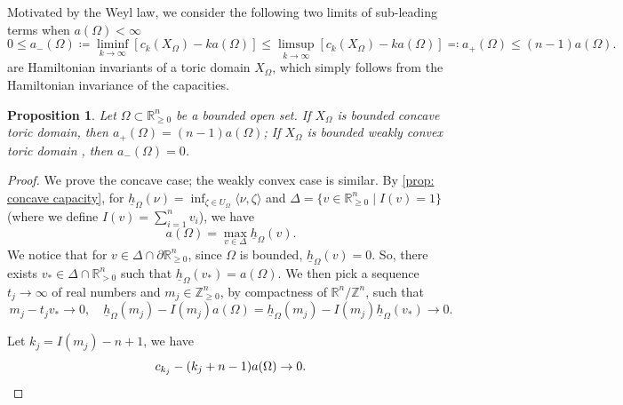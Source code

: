 \documentclass[11pt]{amsart}
\numberwithin{equation}{section}
\theoremstyle{plain}
\newtheorem{Prop}[prop]{Proposition}
\theoremstyle{definition}
\theoremstyle{remark}
\newcommand{\bZ} { {\mathbb{Z}}}
\newcommand{\bR} { {\mathbb{R}}}
\begin{document}
Motivated by the Weyl law, we consider the following two limits of sub-leading terms when $a(\Omega)<\infty$
\begin{equation}\label{equation: refined weyl limits}
      0\leq a_-(\Omega)\coloneqq \liminf_{k\to \infty} \left[ c_k(X_\Omega)-ka(\Omega) \right] \leq \limsup_{k\to \infty} \left[ c_k(X_\Omega)-ka(\Omega) \right] \eqqcolon a_+(\Omega) \leq (n-1)a(\Omega) .
\end{equation}
are Hamiltonian invariants of a toric domain $X_\Omega$, which simply follows from the Hamiltonian invariance of the capacities.

\begin{Prop}\label{prop: weyl limit for convex/concave refinement}Let $\Omega\subset \bR^n_{\geq 0}$ be a bounded open set. If $X_\Omega$ is bounded concave toric domain, then $ a_+(\Omega)=(n-1)a(\Omega)$; If $X_\Omega$ is bounded weakly convex toric domain , then $ a_-(\Omega)=0$.
\end{Prop}
\begin{proof}We prove the concave case; the weakly convex case is similar. By \autoref{prop: concave capacity}, for $\underline{h}_\Omega(\nu)=\inf_{\zeta\in {U_{\Omega}}}\langle \nu,\zeta\rangle $ and $\Delta=\{v\in \bR^n_{\geq 0} \mid I(v)=1\}$ (where we define $I(v) = \sum_{i=1}^nv_i$), we have
\[a(\Omega)=\max_{v\in \Delta} \underline{h}_\Omega(v). \]
We notice that for $v\in  \Delta \cap \partial \bR^n_{\geq 0} $, since $\Omega$ is bounded, $\underline{h}_\Omega(v)=0$. So, there exists $v_*\in  \Delta\cap \bR^n_{>0}$ such that $\underline{h}_\Omega(v_*)=a(\Omega).$ We then pick a sequence $t_j\to \infty$ of real numbers and $m_j\in \bZ^n_{\geq 0}$, by compactness of $\bR^n/\bZ^n$, such that
\[m_j-t_jv_* \to 0,\quad \underline{h}_\Omega(m_j)-I(m_j)a(\Omega)=   \underline{h}_\Omega(m_j)-I(m_j)\underline{h}_\Omega(v_*)\to 0.\]

Let $k_j=I(m_j)-n+1$, we have
\[c_{k_j}-(k_j+n-1)a(\Omega) \to 0.\qedhere\]    
\end{proof}
\end{document}
